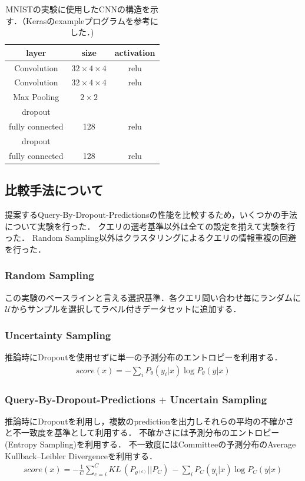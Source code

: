 \begin{table}[h]
    \label{table:mnist_cnn}
    \caption{MNISTの実験に使用したCNNの構造を示す．（Kerasのexampleプログラムを参考にした．)}
    \center
    \begin{tabular}{|c|c|c|} \hline
        layer & size & activation \\ \hline
        Convolution & $32 \times 4 \times 4$ & relu \\
        Convolution & $32 \times 4 \times 4$ & relu \\
        Max Pooling & $2 \times 2$ & \\
        dropout & & \\
        fully connected & 128 & relu \\
        dropout & & \\
        fully connected & 128 & relu \\
        \hline
    \end{tabular}
  \end{table}

\subsection{比較手法について}
提案するQuery-By-Dropout-Predictionsの性能を比較するため，いくつかの手法について実験を行った．
クエリの選考基準以外は全ての設定を揃えて実験を行った．
Random Sampling以外はクラスタリングによるクエリの情報重複の回避を行った．

\subsubsection{Random Sampling}
この実験のベースラインと言える選択基準．各クエリ問い合わせ毎にランダムに$\mathcal{U}$からサンプルを選択してラベル付きデータセットに追加する．

\subsubsection{Uncertainty Sampling}
推論時にDropoutを使用せずに単一の予測分布のエントロピーを利用する．
\begin{eqnarray}
    score(x) =  - \sum_i {P_{\theta}(y_i|x)} \log P_{\theta}(y|x)
\end{eqnarray}

\subsubsection{Query-By-Dropout-Predictions $+$ Uncertain Sampling}
推論時にDropoutを利用し，複数のpredictionを出力しそれらの平均の不確かさと不一致度を基準として利用する．
不確かさには予測分布のエントロピー(Entropy Sampling)を利用する．
不一致度にはCommitteeの予測分布のAverage Kullback–Leibler Divergenceを利用する．
\begin{eqnarray}
    score(x) =  -  \frac{1}{C} \sum_{c=i}^C KL \, (P_{\theta^{(c)}} || P_C) \, - \sum_i {P_C(y_i|x)} \log P_C(y|x)
\end{eqnarray}

